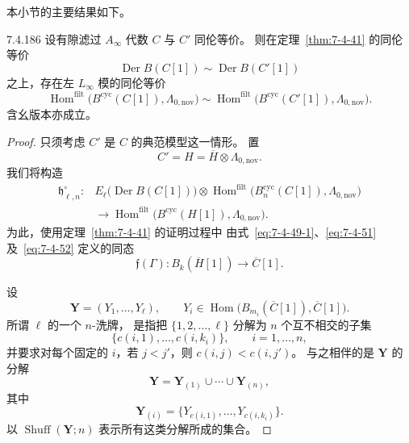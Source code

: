 本小节的主要结果如下。

\begin{theorem}{7.4.186}\label{thm:7-4-186}
设有隙滤过 $A_\infty$ 代数 $C$ 与 $C'$ 同伦等价。
则在定理~\ref{thm:7-4-41} 的同伦等价
\[
\operatorname{Der}B(C[1])
\sim
\operatorname{Der}B(C'[1])
\]
之上，存在左 $L_\infty$ 模的同伦等价
\[
\operatorname{Hom}^{\mathrm{filt}}
\bigl(B^{\mathrm{cyc}}(C[1]),\Lambda_{0,\mathrm{nov}}\bigr)
\sim
\operatorname{Hom}^{\mathrm{filt}}
\bigl(B^{\mathrm{cyc}}(C'[1]),\Lambda_{0,\mathrm{nov}}\bigr).
\]
含幺版本亦成立。
\end{theorem}

\begin{proof}
只须考虑 $C'$ 是 $C$ 的典范模型这一情形。
置
\[
C'=H=\overline H\otimes\Lambda_{0,\mathrm{nov}}.
\]
我们将构造
\begin{equation}
\begin{aligned}
\mathfrak h^\circ_{\ell,n}\colon
&E_\ell\bigl(\operatorname{Der}B(C[1])\bigr)
\otimes
\operatorname{Hom}^{\mathrm{filt}}
\bigl(B_n^{\mathrm{cyc}}(C[1]),\Lambda_{0,\mathrm{nov}}\bigr)\\
&\longrightarrow
\operatorname{Hom}^{\mathrm{filt}}
\bigl(B^{\mathrm{cyc}}(H[1]),\Lambda_{0,\mathrm{nov}}\bigr).
\end{aligned}
\tag{7.4.187}\label{eq:7-4-187}
\end{equation}
为此，使用定理~\ref{thm:7-4-41} 的证明过程中
由式~\eqref{eq:7-4-49-1}、\eqref{eq:7-4-51}
及~\eqref{eq:7-4-52} 定义的同态
\[
\mathfrak f(\Gamma)\colon
B_k(\overline H[1])\longrightarrow\overline C[1].
\]

设
\[
\mathbf Y=(Y_1,\ldots,Y_\ell),
\qquad
Y_i\in
\operatorname{Hom}
\bigl(B_{m_i}(\overline C[1]),\overline C[1]\bigr).
\]
所谓 $\ell$ 的一个 $n$-洗牌，
是指把 $\{1,2,\ldots,\ell\}$ 分解为
$n$ 个互不相交的子集
\[
\{c(i,1),\ldots,c(i,k_i)\},
\qquad i=1,\ldots,n,
\]
并要求对每个固定的 $i$，若 $j<j'$，则
$c(i,j)<c(i,j')$。
与之相伴的是 $\mathbf Y$ 的分解
\[
\mathbf Y
=\mathbf Y_{(1)}\cup\cdots\cup\mathbf Y_{(n)},
\]
其中
\[
\mathbf Y_{(i)}
=\{Y_{c(i,1)},\ldots,Y_{c(i,k_i)}\}.
\]
以 $\operatorname{Shuff}(\mathbf Y;n)$
表示所有这类分解所成的集合。


\end{proof}
